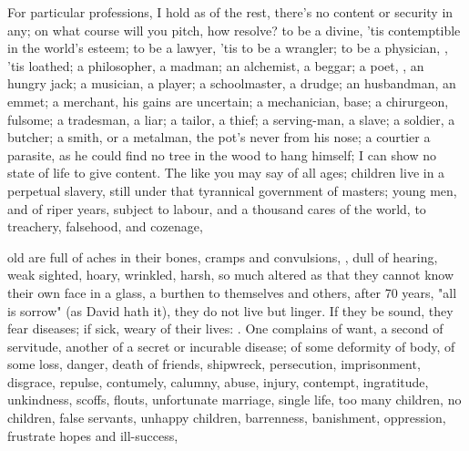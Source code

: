 For particular professions, I hold as of the rest, there's no content or
security in any; on what course will you pitch, how resolve? to be a divine,
'tis contemptible in the world's esteem; to be a lawyer, 'tis to be a wrangler;
to be a physician, , 'tis loathed; a
philosopher, a madman; an alchemist, a beggar; a poet, , an hungry
jack; a musician, a player; a schoolmaster, a drudge; an husbandman, an emmet;
a merchant, his gains are uncertain; a mechanician, base; a chirurgeon,
fulsome; a tradesman, a liar; a tailor, a thief; a
serving-man, a slave; a soldier, a butcher; a smith, or a metalman, the pot's
never from his nose; a courtier a parasite, as he could find no tree in the
wood to hang himself; I can show no state of life to give content. The like you
may say of all ages; children live in a perpetual slavery, still under that
tyrannical government of masters; young men, and of riper years, subject to
labour, and a thousand cares of the world, to treachery, falsehood, and
cozenage,


old are full of aches in their bones, cramps and
convulsions, , dull of hearing, weak sighted, hoary, wrinkled,
harsh, so much altered as that they cannot know their own face in a glass, a
burthen to themselves and others, after 70 years, "all is sorrow" (as David
hath it), they do not live but linger. If they be sound, they fear diseases; if
sick, weary of their lives: . One complains
of want, a second of servitude, another of a secret or
incurable disease; of some deformity of body, of some loss, danger, death of
friends, shipwreck, persecution, imprisonment, disgrace, repulse,
contumely, calumny, abuse, injury, contempt, ingratitude,
unkindness, scoffs, flouts, unfortunate marriage, single life, too many
children, no children, false servants, unhappy children, barrenness,
banishment, oppression, frustrate hopes and ill-success, \etc{}

